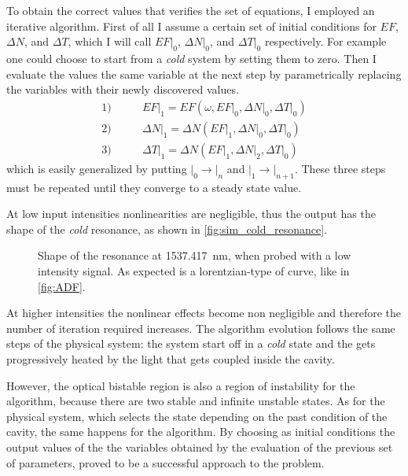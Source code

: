 To obtain the correct values that verifies the set of equations, I employed an iterative algorithm.
First of all I assume a certain set of initial conditions for $EF$, $\Delta N$, and $\Delta T$, which I will call $\left.EF\right|_0$, $\left.\Delta N\right|_0$, and $\left.\Delta T\right|_0$ respectively.
For example one could choose to start from a \textit{cold} system by setting them to zero.
Then I evaluate the values the same variable at the next step by parametrically replacing the variables with their newly discovered values.
\begin{align*}
1) \qquad &\left.EF\right|_1=EF(\omega,\left.EF\right|_0,\left.\Delta N\right|_0,\left.\Delta T\right|_0) \\
2) \qquad &\left.\Delta N\right|_1 = \Delta N(\left.EF\right|_1,\left.\Delta N\right|_0,\left.\Delta T\right|_0) \\
3) \qquad &\left.\Delta T\right|_1 = \Delta N(\left.EF\right|_1,\left.\Delta N\right|_2,\left.\Delta T\right|_0)
\end{align*}
which is easily generalized by putting $\left.\right|_0 \rightarrow \left.\right|_n$ and $\left.\right|_1 \rightarrow \left.\right|_{n+1}$.
These three steps must be repeated until they converge to a steady state value.

At low input intensities nonlinearities are negligible, thus the output has the shape of the \textit{cold} resonance, as shown in \autoref{fig:sim_cold_resonance}.

\begin{figure}[htbp]
	\centering
	
	\caption{
		Shape of the resonance at \SI{1537.417}{\nm}, when probed with a low intensity signal.
		As expected is a lorentzian-type of curve, like in \autoref{fig:ADF}.
	}
	\label{fig:sim_cold_resonance}
\end{figure}

At higher intensities the nonlinear effects become non negligible and therefore the number of iteration required increases.
The algorithm evolution follows the same steps of the physical system: the system start off in a \textit{cold} state and the gets progressively heated by the light that gets coupled inside the cavity.

However, the optical bistable region is also a region of instability for the algorithm, because there are two stable and infinite unstable states.
As for the physical system, which selects the state depending on the past condition of the cavity, the same happens for the algorithm.
By choosing as initial conditions the output values of the the variables obtained by the evaluation of the previous set of parameters, proved to be a successful approach to the problem.

